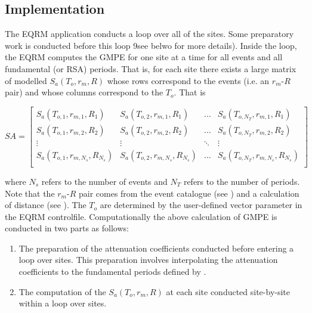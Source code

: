 \subsection{Implementation}
\label{attn:implementation}

The EQRM application conducts a loop over all of the sites. Some
preparatory work is conducted before this loop 9see belwo for more
details). Inside the loop, the EQRM computes the GMPE for one site
at a time for all events and all fundamental (or RSA) periods. That
is, for each site there exists a large matrix of modelled
$S_a(T_o,r_m,R)$ whose rows correspond to the events (i.e. an
$r_m$-$R$ pair) and whose columns correspond to the $T_o$. That is

\begin{math}
 SA = \left[ \begin{array}{ccccc}
S_a(T_{o,1},r_{m,1},R_1) & S_a(T_{o,2},r_{m,1},R_1) &  \hdots & S_a(T_{o,N_T},r_{m,1},R_1) \\
S_a(T_{o,1},r_{m,2},R_2) & S_a(T_{o,2},r_{m,2},R_2) &  \hdots & S_a(T_{o,N_T},r_{m,2},R_2) \\
\vdots & \vdots &  \ddots & \vdots \\
S_a(T_{o,1},r_{m,N_s},R_{N_s}) & S_a(T_{o,2},r_{m,N_s},R_{N_s}) & \hdots & S_a(T_{o,N_T},r_{m,N_s},R_{N_s}) \\
\end{array} \right]
\end{math}

where $N_s$ refers to the number of events and $N_T$ refers to the
number of periods. Note that the $r_m$-$R$ pair comes from the event
catalogue (see ) and a calculation of
distance (see ). The $T_o$ are determined by the
user-defined vector parameter  in the
EQRM controlfile. Computationally the above calculation of GMPE is
conducted in two parts as follows:
\begin{enumerate}
\item The preparation of the attenuation coefficients
conducted before entering a loop over sites. This preparation
involves interpolating the attenuation coefficients to the
fundamental periods defined by . \item
The computation of the $S_a(T_o,r_m,R)$ at each site conducted
site-by-site within a loop over sites.
\end{enumerate}


